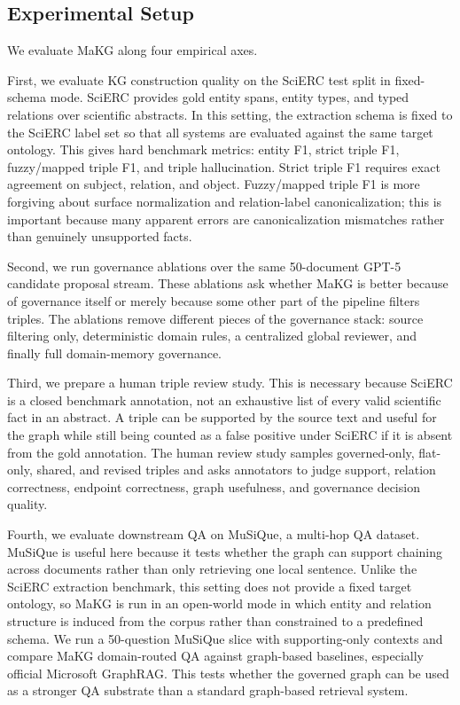 \subsection{Experimental Setup}\label{experimental-setup}

We evaluate MaKG along four empirical axes.

First, we evaluate KG construction quality on the SciERC test split in
fixed-schema mode. SciERC provides gold entity spans, entity types, and
typed relations over scientific abstracts. In this setting, the
extraction schema is fixed to the SciERC label set so that all systems
are evaluated against the same target ontology. This gives hard
benchmark metrics: entity F1, strict triple F1, fuzzy/mapped triple F1,
and triple hallucination. Strict triple F1 requires exact agreement on
subject, relation, and object. Fuzzy/mapped triple F1 is more forgiving
about surface normalization and relation-label canonicalization; this is
important because many apparent errors are canonicalization mismatches
rather than genuinely unsupported facts.

Second, we run governance ablations over the same 50-document GPT-5
candidate proposal stream. These ablations ask whether MaKG is better
because of governance itself or merely because some other part of the
pipeline filters triples. The ablations remove different pieces of the
governance stack: source filtering only, deterministic domain rules, a
centralized global reviewer, and finally full domain-memory governance.

Third, we prepare a human triple review study. This is necessary because
SciERC is a closed benchmark annotation, not an exhaustive list of every
valid scientific fact in an abstract. A triple can be supported by the
source text and useful for the graph while still being counted as a
false positive under SciERC if it is absent from the gold annotation.
The human review study samples governed-only, flat-only, shared, and
revised triples and asks annotators to judge support, relation
correctness, endpoint correctness, graph usefulness, and governance
decision quality.

Fourth, we evaluate downstream QA on MuSiQue, a multi-hop QA dataset.
MuSiQue is useful here because it tests whether the graph can support
chaining across documents rather than only retrieving one local
sentence. Unlike the SciERC extraction benchmark, this setting does not
provide a fixed target ontology, so MaKG is run in an open-world mode in
which entity and relation structure is induced from the corpus rather
than constrained to a predefined schema. We run a 50-question MuSiQue
slice with supporting-only contexts and compare MaKG domain-routed QA
against graph-based baselines, especially official Microsoft GraphRAG.
This tests whether the governed graph can be used as a stronger QA
substrate than a standard graph-based retrieval system.

